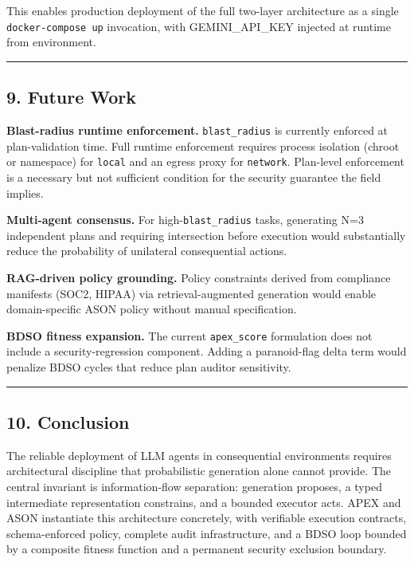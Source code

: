 \documentclass[
]{article}
\begin{document}
This enables production deployment of the full two-layer architecture as
a single \texttt{docker-compose\ up} invocation, with GEMINI\_API\_KEY
injected at runtime from environment.

\begin{center}\rule{0.5\linewidth}{0.5pt}\end{center}

\subsection{9. Future Work}\label{9-future-work}

\textbf{Blast-radius runtime enforcement.} \texttt{blast\_radius} is
currently enforced at plan-validation time. Full runtime enforcement
requires process isolation (chroot or namespace) for \texttt{local} and
an egress proxy for \texttt{network}. Plan-level enforcement is a
necessary but not sufficient condition for the security guarantee the
field implies.

\textbf{Multi-agent consensus.} For high-\texttt{blast\_radius} tasks,
generating N=3 independent plans and requiring intersection before
execution would substantially reduce the probability of unilateral
consequential actions.

\textbf{RAG-driven policy grounding.} Policy constraints derived from
compliance manifests (SOC2, HIPAA) via retrieval-augmented generation
would enable domain-specific ASON policy without manual specification.

\textbf{BDSO fitness expansion.} The current \texttt{apex\_score}
formulation does not include a security-regression component. Adding a
paranoid-flag delta term would penalize BDSO cycles that reduce plan
auditor sensitivity.

\begin{center}\rule{0.5\linewidth}{0.5pt}\end{center}

\subsection{10. Conclusion}\label{10-conclusion}

The reliable deployment of LLM agents in consequential environments
requires architectural discipline that probabilistic generation alone
cannot provide. The central invariant is information-flow separation:
generation proposes, a typed intermediate representation constrains, and
a bounded executor acts. APEX and ASON instantiate this architecture
concretely, with verifiable execution contracts, schema-enforced policy,
complete audit infrastructure, and a BDSO loop bounded by a composite
fitness function and a permanent security exclusion boundary.
\end{document}
